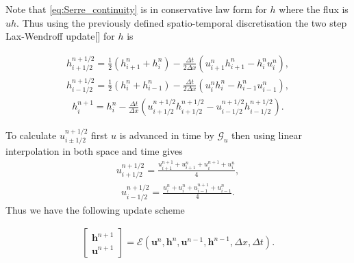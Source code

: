 \documentclass[SingleSpace,12pt,Journal]{Serre_ASCE}
\begin{document}
Note that \eqref{eq:Serre_continuity} is in conservative law form for $h$ where the flux is $uh$. Thus using the previously defined spatio-temporal discretisation the two step Lax-Wendroff update[] for $h$ is
\begin{linenomath*}
\begin{gather}
h^{n + 1/2}_{i+ 1/2} = \frac{1}{2}\left(h^{n}_{i+1} + h^{n}_i\right) - \frac{\Delta t}{2\Delta x}\left(u^n_{i+1}h^n_{i+1} - h^n_{i}u^n_{i}\right),
\end{gather}
\begin{gather}
h^{n + 1/2}_{i- 1/2} = \frac{1}{2}\left(h^{n}_{i} + h^{n}_{i-1}\right) - \frac{\Delta t}{2\Delta x}\left(u^n_{i}h^n_{i} - h^n_{i-1}u^n_{i-1}\right),
\end{gather}
\begin{gather}
h^{n+1}_i = h^{n}_i - \frac{\Delta t}{\Delta x}\left(u^{n + 1/2}_{i+ 1/2}h^{n + 1/2}_{i+ 1/2} - u^{n + 1/2}_{i- 1/2}h^{n + 1/2}_{i- 1/2}\right).
\label{eq:LW4h}
\end{gather}
\end{linenomath*}
To calculate $u^{n + 1/2}_{i \pm 1/2}$ first $u$ is advanced in time by $\mathcal{G}_u$ then using linear interpolation in both space and time gives
\begin{gather}
u^{n + 1/2}_{i+ 1/2} = \frac{u^{n+1}_{i+1} + u^{n}_{i+1} + u^{n+1}_{i} + u^{n}_{i} }{4},
\end{gather}
\begin{gather}
u^{n + 1/2}_{i- 1/2} = \frac{u^{n}_{i} + u^{n}_{i} + u^{n+1}_{i-1}+ u^{n}_{i-1} }{4}.
\end{gather}
Thus we have the following update scheme
\begin{linenomath*}
\begin{gather}
\left[ \begin{array}{l}
\boldsymbol{h}^{n+1} \\
\boldsymbol{u}^{n+1}
 \end{array}\right] = \mathcal{E}\left(\boldsymbol{u}^n,\boldsymbol{h}^n, \boldsymbol{u}^{n-1},\boldsymbol{h}^{n-1}, \Delta x, \Delta t \right). 
\end{gather}
\end{linenomath*}

\end{document}
